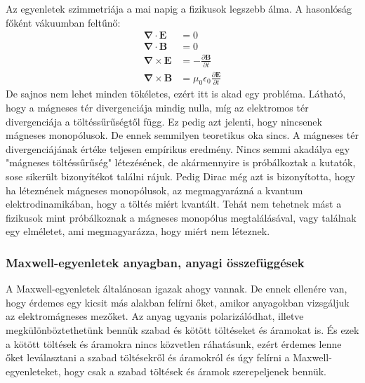 \documentclass[../main.tex]{subfiles}
\begin{document}
Az egyenletek szimmetriája a mai napig a fizikusok legszebb álma. A hasonlóság főként vákuumban feltűnő:
\begin{equation}
    \begin{aligned}
        \boldsymbol{\nabla} \cdot \mathbf{E} &= 0 \\
        \boldsymbol{\nabla} \cdot \mathbf{B} &= 0 \\
        \boldsymbol{\nabla} \times \mathbf{E} &= - \frac{\partial \mathbf{B}}{\partial t} \\
        \boldsymbol{\nabla} \times \mathbf{B} &= \mu_0 \epsilon_0 \frac{\partial \mathbf{E}}{\partial t}
    \end{aligned}
\end{equation}
De sajnos nem lehet minden tökéletes, ezért itt is akad egy probléma.
Látható, hogy a mágneses tér divergenciája mindig nulla, míg az elektromos tér divergenciája a töltéssűrűségtől függ. Ez pedig azt jelenti, hogy nincsenek mágneses monopólusok. De ennek semmilyen teoretikus oka sincs.
A mágneses tér divergenciájának értéke teljesen empírikus eredmény. Nincs semmi akadálya egy "mágneses töltéssűrűség" létezésének, de akármennyire is próbálkoztak a kutatók, sose sikerült bizonyítékot találni rájuk.
Pedig Dirac még azt is bizonyította, hogy ha léteznének mágneses monopólusok, az megmagyarázná a kvantum elektrodinamikában, hogy a töltés miért kvantált. Tehát nem tehetnek mást a fizikusok mint próbálkoznak a mágneses monopólus megtalálásával,
vagy találnak egy elméletet, ami megmagyarázza, hogy miért nem léteznek.

\subsubsection{Maxwell-egyenletek anyagban, anyagi összefüggések}
A Maxwell-egyenletek általánosan igazak ahogy vannak. De ennek ellenére van, hogy érdemes egy kicsit más alakban felírni őket, amikor anyagokban vizsgáljuk az elektromágneses mezőket.
Az anyag ugyanis polarizálódhat, illetve megkülönböztethetünk bennük szabad és kötött töltéseket és áramokat is. És ezek a kötött töltések és áramokra nincs közvetlen ráhatásunk,
ezért érdemes lenne őket leválasztani a szabad töltésekről és áramokról és úgy felírni a Maxwell-egyenleteket, hogy csak a szabad töltések és áramok szerepeljenek bennük.
\end{document}
